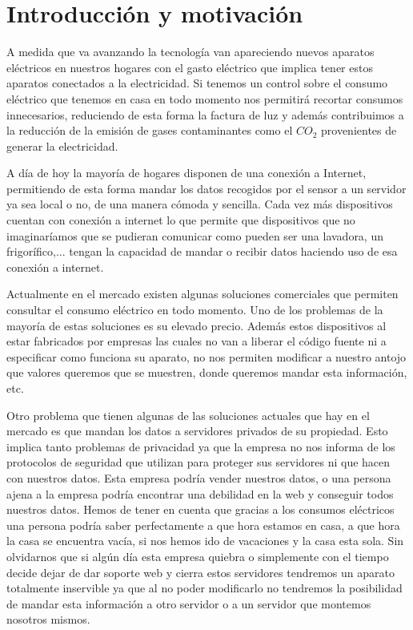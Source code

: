 

\chapter{Introducción y motivación}

A medida que va avanzando la tecnología van apareciendo nuevos aparatos eléctricos en nuestros hogares con el gasto eléctrico que implica tener estos aparatos conectados a la electricidad.
Si tenemos un control sobre el consumo eléctrico que tenemos en casa en todo momento nos permitirá recortar consumos innecesarios, reduciendo de esta forma la factura de luz y además contribuimos a la reducción de la emisión de gases contaminantes como el $CO_2$ provenientes de generar la electricidad.

A día de hoy la mayoría de hogares disponen de una conexión a Internet, permitiendo de esta forma mandar los datos recogidos por el sensor a un servidor ya sea local o no, de una manera cómoda y sencilla. Cada vez más dispositivos cuentan con conexión a internet lo que permite que dispositivos que no imaginaríamos que se pudieran comunicar como pueden ser una lavadora, un frigorífico,... tengan la capacidad de mandar o recibir datos haciendo uso de esa conexión a internet. 

Actualmente en el mercado existen algunas soluciones comerciales que permiten consultar el consumo eléctrico en todo momento. Uno de los problemas de la mayoría de estas soluciones es su elevado precio. Además estos dispositivos al estar fabricados por empresas las cuales no van a liberar el código fuente ni a especificar como funciona su aparato, no nos permiten modificar a nuestro antojo que valores queremos que se muestren, donde queremos mandar esta información, etc.

Otro problema que tienen algunas de las soluciones actuales que hay en el mercado es que mandan los datos a servidores privados de su propiedad. Esto implica tanto problemas de privacidad ya que la empresa no nos informa de los protocolos de seguridad que utilizan para proteger sus servidores ni que hacen con nuestros datos. Esta empresa podría vender nuestros datos, o una persona ajena a la empresa podría encontrar una debilidad en la web y conseguir todos nuestros datos. Hemos de tener en cuenta que gracias a los consumos eléctricos una persona podría saber perfectamente a que hora estamos en casa, a que hora la casa se encuentra vacía, si nos hemos ido de vacaciones y la casa esta sola. Sin olvidarnos que si algún día esta empresa quiebra o simplemente con el tiempo decide dejar de dar soporte web y cierra estos servidores tendremos un aparato totalmente inservible ya que al no poder modificarlo no tendremos la posibilidad de mandar esta información a otro servidor o a un servidor que montemos nosotros mismos.

